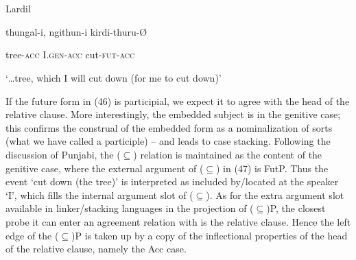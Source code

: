 \documentclass[output=paper]{langsci/langscibook}
\begin{document}
\begin{styleSfondomedioiColorexi}
\ea%
    \label{ex:key:46}
    \gll\\
        \\
    \glt
    \z

          Lardil
\end{styleSfondomedioiColorexi}

\begin{styleSfondomedioiColorexi}
thungal-i,   ngithun-i   kirdi-thuru-Ø 
\end{styleSfondomedioiColorexi}

\begin{styleSfondomedioiColorexi}
tree-\textsc{acc}   I.\textsc{gen-acc}    cut-\textsc{fut-acc} 
\end{styleSfondomedioiColorexi}

\begin{styleSfondomedioiColorexi}
‘…tree, which I will cut down (for me to cut down)’
\end{styleSfondomedioiColorexi}

\begin{styleSfondomedioiColorexi}
If the future form in (46) is participial, we expect it to agree with the head of the relative clause. More interestingly, the embedded subject is in the genitive case; this confirms the construal of the embedded form as a nominalization of sorts (what we have called a participle) – and leads to case stacking. Following the discussion of Punjabi, the (${\subseteq}$) relation is maintained as the content of the genitive case, where the external argument of (${\subseteq}$) in (47) is FutP.  Thus the event ‘cut down (the tree)’ is interpreted as included by/located at the speaker ‘I’, which fills the internal argument slot of (${\subseteq}$). As for the extra argument slot available in linker/stacking languages in the projection of (${\subseteq}$)P, the closest probe it can enter an agreement relation with is the relative clause. Hence the left edge of the (${\subseteq}$)P is taken up by a copy of the inflectional properties of the head of the relative clause, namely the Acc case. 
\end{styleSfondomedioiColorexi}

\begin{styleSfondomedioiColorexi}
\ea%
    \label{ex:key:47}
    \gll\\
        \\
    \glt
    \z

         
\end{styleSfondomedioiColorexi}
\end{document}
